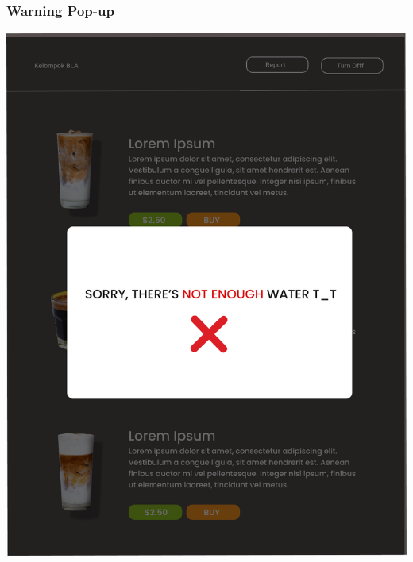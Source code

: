 \documentclass[12pt]{article}
\begin{document}
\subsubsection{Warning Pop-up}
\includegraphics[width=1\linewidth]{./img/warningMenu.png}
\end{document}
